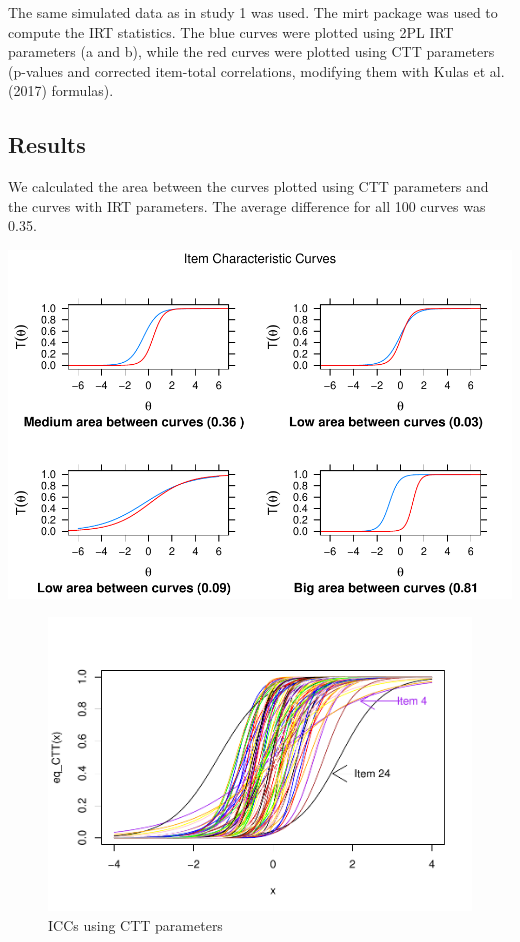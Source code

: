 \documentclass[
  english,
  man,floatsintext]{apa6}
\begin{document}
The same simulated data as in study 1 was used. The mirt package was used to compute the IRT statistics. The blue curves were plotted using 2PL IRT parameters (a and b), while the red curves were plotted using CTT parameters (p-values and corrected item-total correlations, modifying them with Kulas et al. (2017) formulas).

\hypertarget{results-1}{%
\subsection{Results}\label{results-1}}

We calculated the area between the curves plotted using CTT parameters and the curves with IRT parameters. The average difference for all 100 curves was 0.35.

\includegraphics{ICC_project_files/figure-latex/plotting-1.pdf}

\begin{figure}
\centering
\includegraphics{ICC_project_files/figure-latex/AUC-1.pdf}
\caption{\label{fig:AUC}ICCs using CTT parameters}
\end{figure}
\end{document}
